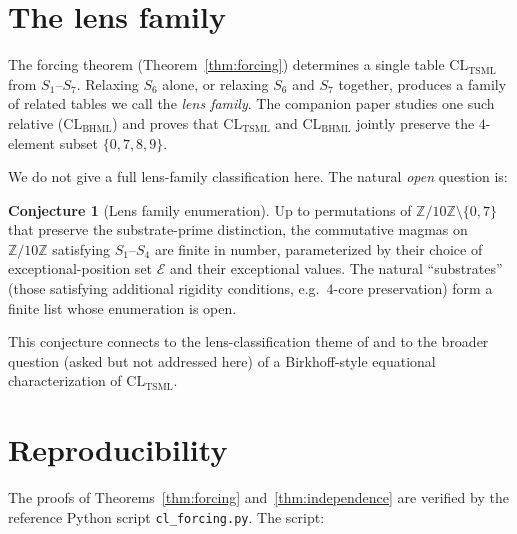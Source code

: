\documentclass[11pt,reqno]{amsart}
\theoremstyle{plain}
\theoremstyle{definition}
\newtheorem{conjecture}[theorem]{Conjecture}
\theoremstyle{remark}
\newcommand{\Z}{\mathbb{Z}}
\newcommand{\TSML}{\mathrm{TSML}}
\newcommand{\BHML}{\mathrm{BHML}}
\newcommand{\CL}{\mathrm{CL}}
\begin{document}
\section{The lens family}
\label{sec:lens-family}

The forcing theorem (Theorem~\ref{thm:forcing}) determines a single
table $\CL_{\TSML}$ from $S_{1}$--$S_{7}$. Relaxing $S_{6}$ alone,
or relaxing $S_{6}$ and $S_{7}$ together, produces a family of
related tables we call the \emph{lens family}. The companion paper
\cite{SandersGishFourCore} studies one such relative ($\CL_{\BHML}$)
and proves that $\CL_{\TSML}$ and $\CL_{\BHML}$ jointly preserve the
$4$-element subset $\{0, 7, 8, 9\}$.

We do not give a full lens-family classification here. The natural
\emph{open} question is:

\begin{conjecture}[Lens family enumeration]
\label{conj:lens-family}
Up to permutations of $\Z/10\Z \setminus \{0, 7\}$ that preserve the
substrate-prime distinction, the commutative magmas on $\Z/10\Z$
satisfying $S_{1}$--$S_{4}$ are finite in number, parameterized by
their choice of exceptional-position set $\mathcal{E}$ and their
exceptional values. The natural ``substrates'' (those satisfying
additional rigidity conditions, e.g.\ $4$-core preservation) form a
finite list whose enumeration is open.
\end{conjecture}

This conjecture connects to the lens-classification theme of
\cite{SandersGishFourCore} and to the broader question (asked but
not addressed here) of a Birkhoff-style equational characterization
of $\CL_{\TSML}$.

\section{Reproducibility}
\label{sec:repro}

The proofs of Theorems~\ref{thm:forcing} and~\ref{thm:independence}
are verified by the reference Python script
\texttt{cl\_forcing.py}. The script:
\end{document}
